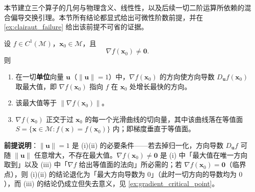 本节建立三个算子的几何与物理含义、线性性，以及后续一切二阶运算所依赖的混合偏导交换引理。本节所有结论都显式给出可微性阶数前提，并在 \cref{ex:clairaut_failure} 给出该前提不可省的证据。

\begin{proposition}[梯度的几何意义]\label{prop:gradient_geometry}
设 $f \in C^1(\mathcal{M})$，$\mathbf{x}_0 \in \mathcal{M}$，且
\[
\nabla f(\mathbf{x}_0) \neq \mathbf{0}.
\]
则
\begin{enumerate}[label=(\roman*)]
    \item 在一切\textbf{单位}向量 $\mathbf u$（$\|\mathbf u\|=1$）中，$\nabla f(\mathbf{x}_0)$ 的方向使方向导数 $D_{\mathbf u}f(\mathbf x_0)$ 取最大值，即 $\nabla f(\mathbf x_0)$ 指向 $f$ 在 $\mathbf x_0$ 处增长最快的方向。
    \item 该最大值等于 $\|\nabla f(\mathbf{x}_0)\|$。
    \item $\nabla f(\mathbf{x}_0)$ 正交于过 $\mathbf{x}_0$ 的每一个光滑曲线的切向量，其中该曲线落在等值面 $S = \{\mathbf{x} \in \mathcal{M} : f(\mathbf{x}) = f(\mathbf{x}_0)\}$ 内；即梯度垂直于等值面。
\end{enumerate}

\textbf{前提说明}：$\|\mathbf u\|=1$ 是 (i)(ii) 的必要条件——若去掉归一化，方向导数 $D_{\mathbf u}f$ 可随 $\|\mathbf u\|$ 任意增大，不存在最大值。$\nabla f(\mathbf x_0)\ne\mathbf 0$ 是 (i) 中「最大值在唯一方向取到」以及 (iii) 中「$\nabla f$ 给出等值面的法向」所必需的；若 $\nabla f(\mathbf x_0)=\mathbf 0$（临界点），则 (i)(ii) 的结论退化为「最大方向导数为 $0$」（此时一切方向的导数均为 $0$），而 (iii) 的结论仍成立但失去意义，见 \cref{ex:gradient_critical_point}。
\end{proposition}

